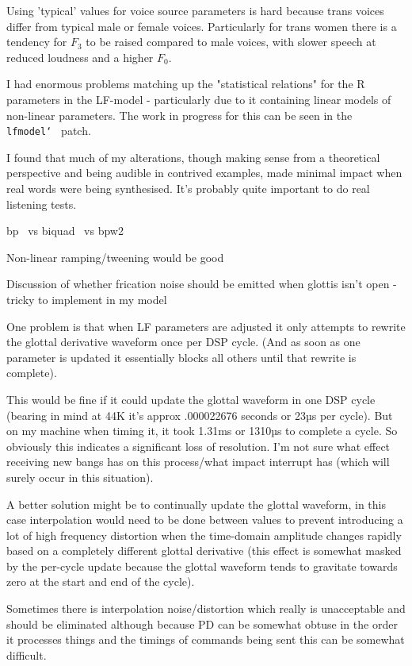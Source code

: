 Using 'typical' values for voice source parameters is hard because trans voices differ from typical male or female voices. \cite{Gunzburger1995} Particularly for trans women there is a tendency for $F_3$ to be raised compared to male voices, with slower speech at reduced loudness and a higher $F_0$. 

I had enormous problems matching up the "statistical relations" for the R parameters in the LF-model \cite{Fant1995} - particularly due to it containing linear models of non-linear parameters. The work in progress for this can be seen in the \texttt{lfmodel\char`~} patch.

I found that much of my alterations, though making sense from a theoretical perspective and being audible in contrived examples, made minimal impact when real words were being synthesised. It's probably quite important to do real listening tests.

bp~ vs biquad~ vs bpw2~

Non-linear ramping/tweening would be good

Discussion of whether frication noise should be emitted when glottis isn't open - tricky to implement in my model

One problem is that when LF parameters are adjusted it only attempts to rewrite the glottal derivative waveform once per DSP cycle. (And as soon as one parameter is updated it essentially blocks all others until that rewrite is complete).

This would be fine if it could update the glottal waveform in one DSP cycle (bearing in mind at 44K it's approx .000022676 seconds or 23µs per cycle). But on my machine when timing it, it took 1.31ms or 1310µs to complete a cycle. So obviously this indicates a significant loss of resolution. I'm not sure what effect receiving new bangs has on this process/what impact interrupt has (which will surely occur in this situation).

A better solution might be to continually update the glottal waveform, in this case interpolation would need to be done between values to prevent introducing a lot of high frequency distortion when the time-domain amplitude changes rapidly based on a completely different glottal derivative (this effect is somewhat masked by the per-cycle update because the glottal waveform tends to gravitate towards zero at the start and end of the cycle).

Sometimes there is interpolation noise/distortion which really is unacceptable and should be eliminated although because PD can be somewhat obtuse in the order it processes things and the timings of commands being sent this can be somewhat difficult.


